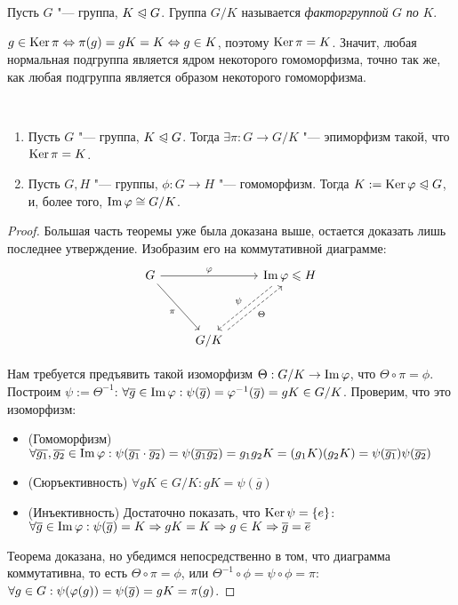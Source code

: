 \begin{definition}
	Пусть $G$ "--- группа, $K \trianglelefteqslant G$. Группа $G / K$ называется \textit{факторгруппой} $G$ \textit{по} $K$.
\end{definition}

\begin{note}
	$g \in \operatorname{Ker}\pi \Leftrightarrow \pi(g) = gK = K \Leftrightarrow g \in K$, поэтому $\operatorname{Ker}\pi = K$. Значит, любая нормальная подгруппа является ядром некоторого гомоморфизма, точно так же, как любая подгруппа является образом некоторого гомоморфизма.
\end{note}

\begin{theorem}~
	\begin{enumerate}
		\item Пусть $G$ "--- группа, $K \trianglelefteqslant G$. Тогда $\exists \pi: G \to G / K$ "--- эпиморфизм такой, что $\ke\pi \hm= K$.
		\item Пусть $G, H$ "--- группы, $\phi: G \to H$ "--- гомоморфизм. Тогда $K \hm{:=} \ke\phi \normal G$, и, более того, $\operatorname{Im}\varphi \cong G / K$.
	\end{enumerate}
\end{theorem}

\begin{proof}
	Большая часть теоремы уже была доказана выше, остается доказать лишь последнее утверждение. Изобразим его на коммутативной диаграмме:
	\[
	\begin{tikzcd}[row sep = huge]
		G \arrow{rr}{\phi} \arrow[swap]{dr}{\pi} && \im\phi \le H \arrow[dashrightarrow, swap, xshift = -4pt]{dl}{\psi}\\
		& G / K \arrow[dashrightarrow, swap, xshift = 4pt]{ur}{\Theta} &
	\end{tikzcd}
	\]
	
	Нам требуется предъявить такой изоморфизм $\Theta: G / K \to \operatorname{Im}\varphi$, что $\Theta \circ \pi = \phi$. Построим $\psi := \Theta^{-1}$: $\forall \overline{g} \in \im\phi: \psi(\overline{g}) = \phi^{-1}(\overline{g}) \hm= gK \in G / K$. Проверим, что это изоморфизм:
	\begin{itemize}
		\item (Гомоморфизм) $\forall \overline{g_1}, \overline{g_2} \in \im\phi: \psi(\overline{g_1}\cdot\overline{g_2}) = \psi(\overline{g_1g_2}) = g_1g_2K \hm= (g_1K)(g_2K) = \psi(\overline{g_1})\psi(\overline{g_2})$
		\item (Сюръективность) $\forall gK \in G / K: gK = \psi(\overline{g})$
		\item (Инъективность) Достаточно показать, что $\operatorname{Ker}\psi = \{e\}$: $\forall \overline{g} \hm\in \im\phi: \psi(\overline{g}) = K \hm\Rightarrow gK = K \Rightarrow g \in K \Rightarrow \overline{g} = \overline{e}$
	\end{itemize}
	
	Теорема доказана, но убедимся непосредственно в том, что диаграмма коммутативна, то есть $\Theta \circ \pi = \phi$, или $\Theta^{-1} \circ \phi = \psi \circ \phi = \pi$: $\forall g \hm\in G: \psi(\phi(g)) = \psi(\overline{g}) = gK = \pi(g)$.
\end{proof}

